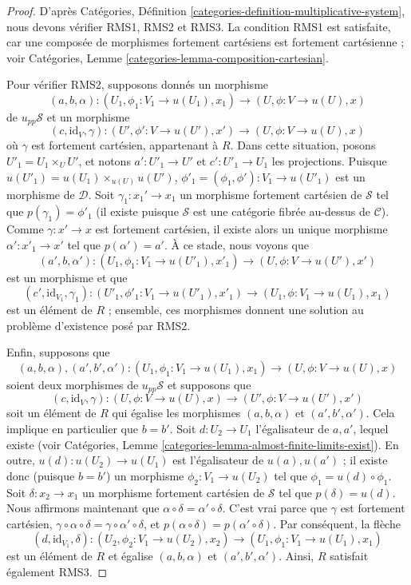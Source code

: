 \begin{proof}
D'après
Catégories, Définition \ref{categories-definition-multiplicative-system},
nous devons vérifier RMS1, RMS2 et RMS3.
La condition RMS1 est satisfaite, car une composée de morphismes fortement cartésiens est
fortement cartésienne ; voir
Catégories, Lemme \ref{categories-lemma-composition-cartesian}.

\medskip\noindent
Pour vérifier RMS2, supposons donnés un morphisme
$$
(a, b, \alpha) :
(U_1, \phi_1 : V_1 \to u(U_1), x_1)
\longrightarrow
(U, \phi : V \to u(U), x)
$$
de $u_{pp}\mathcal{S}$ et un morphisme
$$
(c, \text{id}_V, \gamma) :
(U', \phi' : V \to u(U'), x')
\longrightarrow
(U, \phi : V \to u(U), x)
$$
où $\gamma$ est fortement cartésien, appartenant à $R$. Dans cette situation, posons
$U'_1 = U_1 \times_U U'$, et notons $a' : U'_1 \to U'$ et
$c' : U'_1 \to U_1$ les projections.
Puisque $u(U'_1) = u(U_1) \times_{u(U)} u(U')$,
$\phi'_1 = (\phi_1, \phi') : V_1 \to u(U'_1)$ est
un morphisme de $\mathcal{D}$. Soit $\gamma_1 : x_1' \to x_1$
un morphisme fortement cartésien de $\mathcal{S}$ tel que
$p(\gamma_1) = \phi'_1$ (il existe puisque $\mathcal{S}$ est une
catégorie fibrée au-dessus de $\mathcal{C}$). Comme $\gamma : x' \to x$ est
fortement cartésien, il existe alors un unique morphisme
$\alpha' : x'_1 \to x'$ tel que $p(\alpha') = a'$.
À ce stade, nous voyons que
$$
(a', b, \alpha') :
(U_1, \phi_1 : V_1 \to u(U'_1), x'_1)
\longrightarrow
(U, \phi : V \to u(U'), x')
$$
est un morphisme et que
$$
(c', \text{id}_{V_1}, \gamma_1) :
(U'_1, \phi'_1 : V_1 \to u(U'_1), x'_1)
\longrightarrow
(U_1, \phi : V_1 \to u(U_1), x_1)
$$
est un élément de $R$ ; ensemble, ces morphismes donnent une solution au problème
d'existence posé par RMS2.

\medskip\noindent
Enfin, supposons que
$$
(a, b, \alpha), (a', b', \alpha') :
(U_1, \phi_1 : V_1 \to u(U_1), x_1)
\longrightarrow
(U, \phi : V \to u(U), x)
$$
soient deux morphismes de $u_{pp}\mathcal{S}$ et supposons que
$$
(c, \text{id}_V, \gamma) :
(U, \phi : V \to u(U), x)
\longrightarrow
(U', \phi : V \to u(U'), x')
$$
soit un élément de $R$ qui égalise les morphismes
$(a, b, \alpha)$ et $(a', b', \alpha')$. Cela implique en particulier
que $b = b'$. Soit $d : U_2 \to U_1$ l'égalisateur de $a, a'$, lequel
existe (voir
Catégories, Lemme \ref{categories-lemma-almost-finite-limits-exist}).
En outre, $u(d) : u(U_2) \to u(U_1)$ est l'égalisateur de $u(a), u(a')$ ;
il existe donc (puisque $b = b'$) un morphisme $\phi_2 : V_1 \to u(U_2)$ tel que
$\phi_1 = u(d) \circ \phi_1$. Soit $\delta : x_2 \to x_1$ un morphisme fortement
cartésien de $\mathcal{S}$ tel que $p(\delta) = u(d)$.
Nous affirmons maintenant que $\alpha \circ \delta = \alpha' \circ \delta$.
C'est vrai parce que
$\gamma$ est fortement cartésien,
$\gamma \circ \alpha \circ \delta = \gamma \circ \alpha' \circ \delta$, et
$p(\alpha \circ \delta) = p(\alpha' \circ \delta)$.
Par conséquent, la flèche
$$
(d, \text{id}_{V_1}, \delta) :
(U_2, \phi_2 : V_1 \to u(U_2), x_2)
\longrightarrow
(U_1, \phi_1 : V_1 \to u(U_1), x_1)
$$
est un élément de $R$ et égalise $(a, b, \alpha)$ et $(a', b', \alpha')$.
Ainsi, $R$ satisfait également RMS3.
\end{proof}

